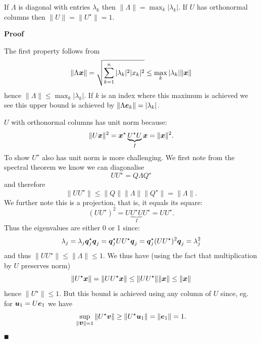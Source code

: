 \begin{proposition} If $\ensuremath{\Lambda}$ is diagonal with entries $\ensuremath{\lambda}_k$ then $\|\ensuremath{\Lambda}\| = \max_k |\ensuremath{\lambda}_k|$. If $U$ has orthonormal columns then $\|U\| = \|U^\ensuremath{\star}\| = 1$.

\end{proposition}
\textbf{Proof}

The first property follows from
\[
\| \Lambda \bm{{\mbox{\boldmath$x$\unboldmath}}}\| = \sqrt{\sum_{k=1}^n |\lambda_k|^2 |x_k|^2} \leq  \max_k |\lambda_k| \| \bm{{\mbox{\boldmath$x$\unboldmath}}} \|
\]
hence $\|\ensuremath{\Lambda}\| \ensuremath{\leq}  \max_k |\ensuremath{\lambda}_k|$. If $k$ is an index where this maximum is achieved we see this upper bound is achieved by $\| \Lambda\bm{{\mbox{\boldmath$e$\unboldmath}}}_k\| = |\lambda_k|$.

$U$ with orthonormal columns has unit norm because:
\[
 \|U \bm{{\mbox{\boldmath$x$\unboldmath}}}\|^2 = \bm{{\mbox{\boldmath$x$\unboldmath}}}^\star \underbrace{U^\star U}_I \bm{{\mbox{\boldmath$x$\unboldmath}}} =  \|\bm{{\mbox{\boldmath$x$\unboldmath}}}\|^2.
\]
To show $U^\ensuremath{\star}$ also has unit norm is more challenging. We first note from the spectral theorem we know we can diagonalise
\[
U U^\ensuremath{\star} = Q \ensuremath{\Lambda} Q^\ensuremath{\star}
\]
and therefore 
\[
\| U U^\ensuremath{\star} \| \ensuremath{\leq} \|Q \| \| \ensuremath{\Lambda} \| \| Q^\ensuremath{\star} \| =\| \ensuremath{\Lambda} \|.
\]
We further note this is a projection, that is, it equals its square:
\[
(U U^\ensuremath{\star})^2 = U \underbrace{U^\ensuremath{\star} U}_{I} U^\ensuremath{\star} = U U^\ensuremath{\star}.
\]
Thus the eigenvalues are either 0 or 1 since:
\[
\lambda_j = \lambda_j \bm{{\mbox{\boldmath$q$\unboldmath}}}_j^\star \bm{{\mbox{\boldmath$q$\unboldmath}}}_j = \bm{{\mbox{\boldmath$q$\unboldmath}}}_j^\star U U^\star \bm{{\mbox{\boldmath$q$\unboldmath}}}_j = \bm{{\mbox{\boldmath$q$\unboldmath}}}_j^\star (U U^\star)^2 \bm{{\mbox{\boldmath$q$\unboldmath}}}_j = \lambda_j^2
\]
and thus $\| U U^\ensuremath{\star} \| \ensuremath{\leq} \| \ensuremath{\Lambda}\| \ensuremath{\leq} 1$. We thus have  (using the fact that multiplication by $U$ preserves norm)
\[
\|U^\star \bm{{\mbox{\boldmath$x$\unboldmath}}} \| = \|U U^ \star \bm{{\mbox{\boldmath$x$\unboldmath}}} \| \leq \| U U^\star\| \| \bm{{\mbox{\boldmath$x$\unboldmath}}}\| \leq \| \bm{{\mbox{\boldmath$x$\unboldmath}}}\|
\]
hence $\| U^\ensuremath{\star}\| \ensuremath{\leq} 1$. But this bound is achieved using any column of $U$ since, eg. for $\bm{{\mbox{\boldmath$u$\unboldmath}}}_1 = U\bm{{\mbox{\boldmath$e$\unboldmath}}}_1$ we have
\[
\sup_{\|\bm{{\mbox{\boldmath$v$\unboldmath}}}\|=1} \| U^\star \bm{{\mbox{\boldmath$v$\unboldmath}}}\| \geq\| U^\star \bm{{\mbox{\boldmath$u$\unboldmath}}}_1 \| = \| \bm{{\mbox{\boldmath$e$\unboldmath}}}_1 \| = 1.
\]
\ensuremath{\QED}

